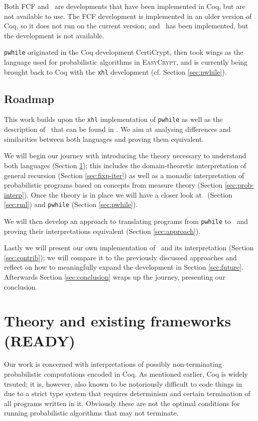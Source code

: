 \documentclass[11pt, leqno, titlepage]{article}
\theoremstyle{definition}
\begin{document}
Both FCF and \rml\ are developments that have been implemented in Coq, but are not
available to use. The FCF development is implemented in an older version of Coq, so
it does not run on the current version; and \rml\ has been implemented, but the
development is not available.

\texttt{pwhile} originated in the Coq development CertiCrypt, then took wings as the
language used for probabilistic algorithms in \textsc{EasyCrypt}, and is currently
being brought back to Coq with the \texttt{xhl} development (cf. Section
\ref{sec:pwhile}).

\subsection{Roadmap}
This work builds upon the \texttt{xhl} implementation of \texttt{pwhile} as well as
the description of \rml\ that can be found in \cite{rml-paper}. We aim at analysing
differences and similarities between both languages and proving them equivalent.

We will begin our journey with introducing the theory necessary to understand both
languages (Section \ref{sec:theory}); this includes the domain-theoretic
interpretation of general recursion (Section \ref{sec:fixp-iter}) as well as a
monadic interpretation of probabilistic programs based on concepts from measure
theory (Section \ref{sec:prob-interp}). Once the theory is in place we will have a
closer look at \rml\ (Section \ref{sec:rml}) and \texttt{pwhile} (Section
\ref{sec:pwhile}).

We will then develop an approach to translating programs from \texttt{pwhile} to
\rml\ and proving their interpretations equivalent (Section \ref{sec:approach}).

Lastly we will present our own implementation of \rml\ and its interpretation
(Section \ref{sec:contrib}); we will compare it to the previously discussed
approaches and reflect on how to meaningfully expand the development in Section
\ref{sec:future}. Afterwards Section \ref{sec:conclusion} wraps up the journey,
presenting our conclusion.


\section{Theory and existing frameworks (READY)} 
\label{sec:theory}

Our work is concerned with interpretations of possibly non-terminating probabilistic
computations encoded in Coq. As mentioned earlier, Coq is widely trsuted; it is,
however, also known to be notoriously difficult to code things in due to a strict
type system that requires determinism and certain termination of all programs written
in it. Obviously these are not the optimal conditions for running probabilistic
algorithms that may not terminate.
\end{document}
